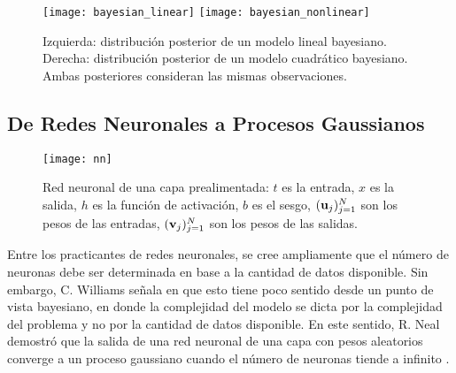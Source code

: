 \begin{figure}[h]
	\centering
	\texttt{[image: bayesian\_linear]}
	\texttt{[image: bayesian\_nonlinear]}
	\caption{Izquierda: distribución posterior de un modelo lineal bayesiano. Derecha: distribución posterior de un modelo cuadrático bayesiano. Ambas posteriores consideran las mismas observaciones.}
	\label{fig:hierarchical_linear_quadratic}
\end{figure}

\subsection{De Redes Neuronales a Procesos Gaussianos}
\label{ssub:NN2GP}

\begin{figure}
	\centering
	\texttt{[image: nn]}\\
	\caption{Red neuronal de una capa prealimentada: \(t\) es la entrada, \(x\) es la salida, \(h\) es la función de activación, \(b\) es el sesgo, \((\mathbf{u}_j)_{j=1}^N\) son los pesos de las entradas, \((\mathbf{v}_j)_{j=1}^N\) son los pesos de las salidas.}
	\label{fig:NN}
\end{figure}

Entre los practicantes de redes neuronales, se cree ampliamente que el número de neuronas debe ser determinada en base a la cantidad de datos disponible. Sin embargo, C. Williams señala en \cite{NIPS1996_1197} que esto tiene poco sentido desde un punto de vista bayesiano, en donde la complejidad del modelo se dicta por la complejidad del problema y no por la cantidad de datos disponible. En este sentido, R. Neal demostró que la salida de una red neuronal de una capa con pesos aleatorios converge a un proceso gaussiano cuando el número de neuronas tiende a infinito \cite{Neal:ARD}.

